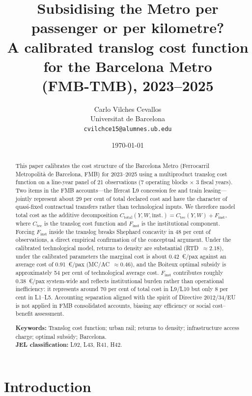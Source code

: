 \documentclass[11pt,a4paper]{article}
\title{\textbf{Subsidising the Metro per passenger or per kilometre?\\
A calibrated translog cost function for the Barcelona Metro\\
(FMB-TMB), 2023--2025}}
\author{Carlo Vilches Cevallos \\
\small{Universitat de Barcelona} \\
\small{\texttt{cvilchce15@alumnes.ub.edu}}}
\date{\today}
\begin{document}
\maketitle

\begin{abstract}
\noindent This paper calibrates the cost structure of the Barcelona Metro
(Ferrocarril Metropolit\`{a} de Barcelona, FMB) for 2023--2025 using a
multiproduct translog cost function on a line-year panel of 21 observations
(7 operating blocks $\times$ 3 fiscal years). Two items in the FMB
accounts---the Ifercat L9 concession fee and train leasing---jointly
represent about 29 per cent of total declared cost and have the character
of quasi-fixed contractual transfers rather than technological inputs. We
therefore model total cost as the additive decomposition
$C_{\text{total}}(Y,W,\text{inst.}) = C_{\text{tec}}(Y,W) + F_{\text{inst}}$,
where $C_{\text{tec}}$ is the translog cost function and $F_{\text{inst}}$
is the institutional component. Forcing $F_{\text{inst}}$ inside the
translog breaks Shephard concavity in 48 per cent of observations, a
direct empirical confirmation of the conceptual argument. Under the
calibrated technological model, returns to density are substantial
(RTD~$\approx 2.18$), under the calibrated parameters the marginal cost is
about 0.42~\euro{}/pax against an average cost of 0.91~\euro{}/pax
(MC/AC~$\approx 0.46$), and the Boiteux optimal subsidy is approximately
54 per cent of technological average cost. $F_{\text{inst}}$ contributes
roughly 0.38~\euro{}/pax system-wide and reflects institutional burden
rather than operational inefficiency: it represents around 70 per cent of
total cost in L9/L10 but only 8 per cent in L1--L5. Accounting separation
aligned with the spirit of Directive 2012/34/EU is not applied in FMB
consolidated accounts, biasing any efficiency or social cost--benefit
assessment.

\bigskip
\noindent\textbf{Keywords:} Translog cost function; urban rail; returns
to density; infrastructure access charge; optimal subsidy; Barcelona.\\
\textbf{JEL classification:} L92, L43, R41, H42.
\end{abstract}

\section{Introduction}
\label{sec:intro}
\end{document}
